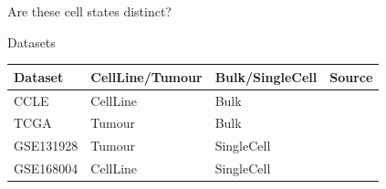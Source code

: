 \documentclass[aspectratio=169,9pt]{beamer}
\begin{document}
    \begin{frame}[standout]
        Are these cell states distinct?
    \end{frame}

    \begin{frame}{Datasets}
    \begin{table}[]
        \centering
        \begin{tabular}{|l|l|l|l|}
            \hline
            \textbf{Dataset} & \textbf{CellLine/Tumour} & \textbf{Bulk/SingleCell} & \textbf{Source}\\ \hline
            CCLE             & CellLine                 & Bulk                     & \cite{CCLE}\\ \hline
            TCGA             & Tumour                   & Bulk                     & \cite{TCGA-GBM}\\ \hline
            GSE131928        & Tumour                   & SingleCell               & \cite{Neftel}  \\ \hline
            GSE168004        & CellLine                 & SingleCell               & \cite{scCL_GBM}\\ \hline
            \end{tabular}
    \end{table}
    \end{frame}
\end{document}

